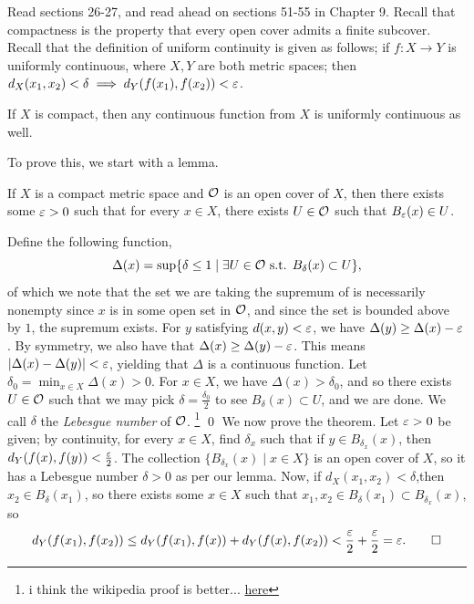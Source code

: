 \noindent Read sections 26-27, and read ahead on sections 51-55 in Chapter 9. Recall that compactness is the property that every open cover admits a finite subcover. Recall that the definition of uniform continuity is given as follows; if $f : X \to Y$ is uniformly continuous, where $X, Y$ are both metric spaces; then $d_X(x_1, x_2) < \delta \implies d_Y(f(x_1), f(x_2)) < \varepsilon$.
\begin{simplethm}
    If $X$ is compact, then any continuous function from $X$ is uniformly continuous as well.
\end{simplethm}
\noindent To prove this, we start with a lemma.
\begin{simplelemma}
    If $X$ is a compact metric space and $\mathcal O$ is an open cover of $X$, then there exists some $\varepsilon > 0$ such that for every $x \in X$, there exists $U \in \mathcal O$ such that $B_\varepsilon(x) \in U$.
\end{simplelemma}
\noindent Define the following function,
\[ \Delta(x) = \sup \{\delta \leq 1 \mid \exists U \in \mathcal O \text{ s.t. } B_\delta(x) \subset U\}, \]
of which we note that the set we are taking the supremum of is necessarily nonempty since $x$ is in some open set in $\mathcal O$, and since the set is bounded above by $1$, the supremum exists. For $y$ satisfying $d(x, y) < \varepsilon$, we have $\Delta(y) \geq \Delta(x) - \varepsilon$. By symmetry, we also have that $\Delta(x) \geq \Delta(y) - \varepsilon$. This means $\left\lvert \Delta(x) - \Delta(y) \right\rvert < \varepsilon$, yielding that $\Delta$ is a continuous function.
\medskip\newline
Let $\delta_0 = \min_{x \in X} \Delta(x) > 0$. For $x \in X$, we have $\Delta(x) > \delta_0$, and so there exists $U \in \mathcal O$ such that we may pick $\delta = \frac{\delta_0}{2}$ to see $B_\delta(x) \subset U$, and we are done. We call $\delta$ the \textit{Lebesgue number} of $\mathcal O$. \footnote{i think the wikipedia proof is better... \href{https://en.wikipedia.org/wiki/Lebesgue\%27s_number_lemma}{here}} \qed
\medskip\newline
We now prove the theorem. Let $\varepsilon > 0$ be given; by continuity, for every $x \in X$, find $\delta_x$ such that if $y \in B_{\delta_x}(x)$, then $d_Y(f(x), f(y)) < \frac{\varepsilon}{2}$. The collection $\{B_{\delta_x}(x) \mid x \in X\}$ is an open cover of $X$, so it has a Lebesgue number $\delta > 0$ as per our lemma. Now, if $d_X(x_1, x_2) < \delta$,then $x_2 \in B_\delta(x_1)$, so there exists some $x \in X$ such that $x_1, x_2 \in B_\delta(x_1) \subset B_{\delta_x}(x)$, so
\[ d_Y(f(x_1), f(x_2)) \leq d_Y(f(x_1), f(x)) + d_Y(f(x), f(x_2)) < \frac{\varepsilon}{2} + \frac{\varepsilon}{2} = \varepsilon. \qed \]

